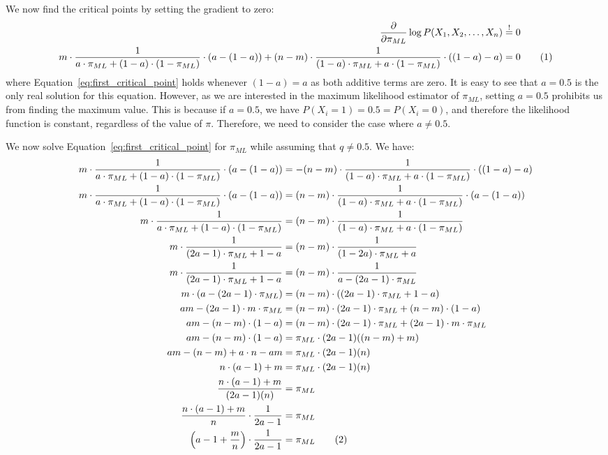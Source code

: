 \documentclass{article}
\newcommand{\stepandtag}{%
  \refstepcounter{equation}%
  \tag{\theequation}%
}
\newcommand{\piml}{\ensuremath{\pi_{ML}}}
\begin{document}
We now find the critical points by setting the gradient to zero:
\begin{align*}
    \frac{\partial}{\partial \pi_{ML}} \log P(X_1, X_2, \dots, X_n) &\overset{!}{=} 0 \\
    m \cdot \frac{1}{a \cdot \pi_{ML} + (1-a) \cdot (1-\pi_{ML})} \cdot (a - (1-a))
    + (n - m) \cdot \frac{1}{(1-a) \cdot \piml + a \cdot (1-\piml)} \cdot ((1-a) - a) &= 0 \stepandtag \label{eq:first_critical_point}
\end{align*}
where Equation~\ref{eq:first_critical_point} holds whenever $(1-a) = a$ as both additive terms are zero. It is easy to see that $a=0.5$ is the only real solution for this equation. However, as we are interested in the maximum likelihood estimator of $\pi_{ML}$, setting $a=0.5$ prohibits us from finding the maximum value.
This is because if $a=0.5$, we have $P(X_i = 1) = 0.5 = P(X_i = 0)$, and therefore the likelihood function is constant, regardless of the value of $\pi$. Therefore, we need to consider the case where $a\neq 0.5$.

We now solve Equation~\ref{eq:first_critical_point} for $\piml$ while assuming that $q\neq 0.5$. 
We have:
\begin{align*}
    m \cdot \frac{1}{a \cdot \pi_{ML} + (1-a) \cdot (1-\pi_{ML})} \cdot (a - (1-a))
    &= -(n - m) \cdot \frac{1}{(1-a) \cdot \pi_{ML} + a \cdot (1-\pi_{ML})} \cdot ((1-a) - a) \\
    m \cdot \frac{1}{a \cdot \pi_{ML} + (1-a) \cdot (1-\pi_{ML})} \cdot (a - (1-a))
    &= (n - m) \cdot \frac{1}{(1-a) \cdot \pi_{ML} + a \cdot (1-\pi_{ML})} \cdot (a - (1-a)) \\
    m \cdot \frac{1}{a \cdot \pi_{ML} + (1-a) \cdot (1-\pi_{ML})}
    &= (n - m) \cdot \frac{1}{(1-a) \cdot \pi_{ML} + a \cdot (1-\pi_{ML})} \\
    m \cdot \frac{1}{(2a-1) \cdot \pi_{ML} + 1 - a} 
    &= (n - m) \cdot \frac{1}{(1 - 2a) \cdot \piml + a} \\
    m \cdot \frac{1}{(2a-1) \cdot \pi_{ML} + 1 - a}
    &= (n - m) \cdot \frac{1}{a - (2a - 1) \cdot \piml} \\
    m \cdot \left( a - (2a - 1) \cdot \piml \right) 
    &= (n - m) \cdot \left( (2a-1) \cdot \piml + 1 - a \right)  \\
    am - (2a -1)\cdot m \cdot \piml
    &= (n - m) \cdot (2a-1) \cdot \piml + (n - m) \cdot(1 -a)  \\
    am - (n - m) \cdot(1 -a)
    &= (n - m) \cdot (2a-1) \cdot \piml + (2a -1)\cdot m \cdot \piml \\
    am - (n - m) \cdot(1 -a)
    &= \piml \cdot (2a -1) ((n - m) + m)  \\
    am - (n - m) + a \cdot n - am
    &= \piml \cdot (2a -1) (n)  \\
    n \cdot (a - 1) + m
    &= \piml \cdot (2a -1) (n)  \\
    \frac{n \cdot (a - 1) + m}{(2a -1) (n)}
    &= \piml \\
    \frac{n \cdot (a - 1) + m}{n} \cdot \frac{1}{2a -1}
    &= \piml \\
    \left( a - 1 + \frac{m}{n} \right) \cdot \frac{1}{2a -1}
    &= \piml \stepandtag \label{eq:ml_estimator_problem_1}
\end{align*}
\end{document}
